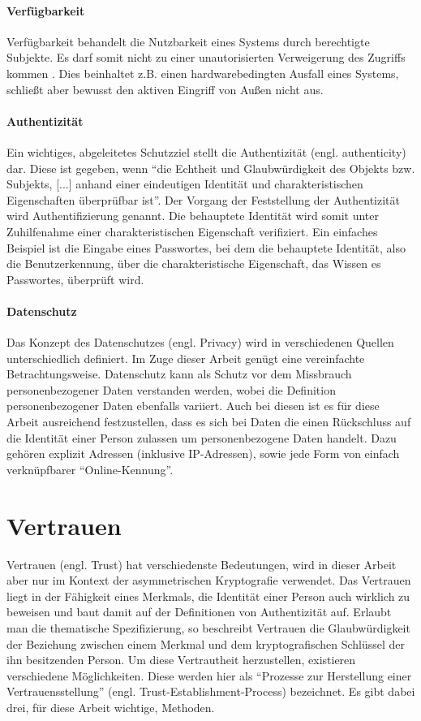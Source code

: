 \paragraph{Verfügbarkeit}
Verfügbarkeit behandelt die Nutzbarkeit eines Systems durch berechtigte Subjekte. Es darf somit nicht zu einer unautorisierten Verweigerung des Zugriffs kommen \cite[p. 12]{Eckert2013}. Dies beinhaltet z.B. einen hardwarebedingten Ausfall eines Systems, schließt aber bewusst den aktiven Eingriff von Außen nicht aus.
 
\paragraph{Authentizität}
Ein wichtiges, abgeleitetes Schutzziel stellt die Authentizität (engl. authenticity) dar. Diese ist gegeben, wenn \enquote{die Echtheit und Glaubwürdigkeit des Objekts bzw. Subjekts, [...] anhand einer eindeutigen Identität und charakteristischen Eigenschaften überprüfbar ist}\cite[p. 8]{Eckert2013}. Der Vorgang der Feststellung der Authentizität wird Authentifizierung genannt. Die behauptete Identität wird somit unter Zuhilfenahme einer charakteristischen Eigenschaft verifiziert. Ein einfaches Beispiel ist die Eingabe eines Passwortes, bei dem die behauptete Identität, also die Benutzerkennung, über die charakteristische Eigenschaft, das Wissen es Passwortes, überprüft wird.  

\paragraph{Datenschutz}
Das Konzept des Datenschutzes (engl. Privacy) wird in verschiedenen Quellen unterschiedlich definiert. Im Zuge dieser Arbeit genügt eine vereinfachte Betrachtungsweise. Datenschutz kann als Schutz vor dem Missbrauch personenbezogener Daten verstanden werden, wobei die Definition personenbezogener Daten ebenfalls variiert. Auch bei diesen ist es für diese Arbeit ausreichend festzustellen, dass es sich bei Daten die einen Rückschluss auf die Identität einer Person zulassen um personenbezogene Daten handelt. Dazu gehören explizit Adressen (inklusive IP-Adressen), sowie jede Form von einfach verknüpfbarer ``Online-Kennung''\cite{Schwenke2018}.     

\section{Vertrauen}
\label{sec:trust}
Vertrauen (engl. Trust) hat verschiedenste Bedeutungen, wird in dieser Arbeit aber nur im Kontext der asymmetrischen Kryptografie verwendet. Das Vertrauen liegt in der Fähigkeit eines Merkmals, die Identität einer Person auch wirklich zu beweisen und baut damit auf der Definitionen von Authentizität auf\cite{Perrin2010}. Erlaubt man die thematische Spezifizierung, so beschreibt Vertrauen die Glaubwürdigkeit der Beziehung zwischen einem Merkmal und dem kryptografischen Schlüssel der ihn besitzenden Person. Um diese Vertrautheit herzustellen, existieren verschiedene Möglichkeiten. Diese werden hier als ``Prozesse zur Herstellung einer Vertrauensstellung'' (engl. Trust-Establishment-Process) bezeichnet. Es gibt dabei drei, für diese Arbeit wichtige, Methoden.

